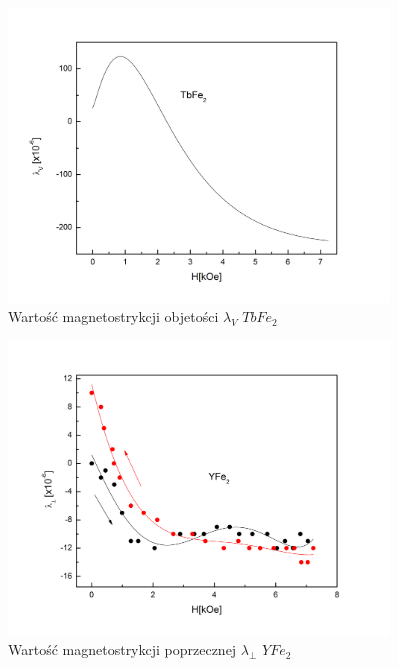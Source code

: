 \documentclass[a4paper,12pt]{article}
\numberwithin{equation}{section}
\begin{document}
\begin{figure}[h]
    \centering
    \includegraphics[width =0.9\textwidth]{../img/magneto/TbObjetosc}
    \caption{Wartość magnetostrykcji objetości $\lambda_{V}$ $TbFe_2$}
    \label{TbObjetosc}
\end{figure}




\begin{figure}[h]
    \centering
    \includegraphics[width =0.9\textwidth]{../img/magneto/Ypoprzeczna}
    \caption{Wartość magnetostrykcji poprzecznej $\lambda_{\perp}$ $YFe_2$}
    \label{Ypoprzeczna}
\end{figure}
\end{document}
